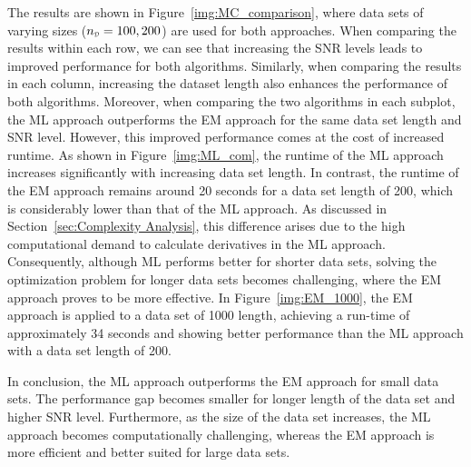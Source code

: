  
The results are shown in Figure~\ref{img:MC_comparison}, where  data sets of varying sizes ($\nD=
100,200$) are used for both approaches. When comparing the results within each row, we can see that increasing the SNR levels leads to improved performance for both algorithms. Similarly, when comparing the results in each column, increasing the dataset length also enhances the performance of both algorithms. Moreover, when comparing the two algorithms in each subplot, the ML approach outperforms the EM approach for the same data set length and SNR level. However, this improved performance comes at the cost of increased runtime. As shown in Figure~\ref{img:ML_com}, the runtime of the ML approach increases significantly with increasing data set length. In contrast, the runtime of the EM approach remains around 20 seconds for a data set length of 200, which is considerably lower than that of the ML approach. As discussed in Section~\ref{sec:Complexity Analysis}, this difference arises due to the high computational demand to calculate derivatives in the ML approach. Consequently, although ML performs better for shorter data sets, solving the optimization problem for longer data sets becomes challenging, where the EM approach proves to be more effective. In Figure~\ref{img:EM_1000}, the EM approach is applied to a data set of 1000 length, achieving a run-time of approximately 34 seconds and showing better performance than the ML approach with a data set length of 200. 

In conclusion, the ML approach outperforms the EM approach for small data sets. The performance gap becomes smaller for longer length of the data set and higher SNR level. Furthermore, as the size of the data set increases, the ML approach becomes computationally challenging, whereas the EM approach is more efficient and better suited for large data sets.

